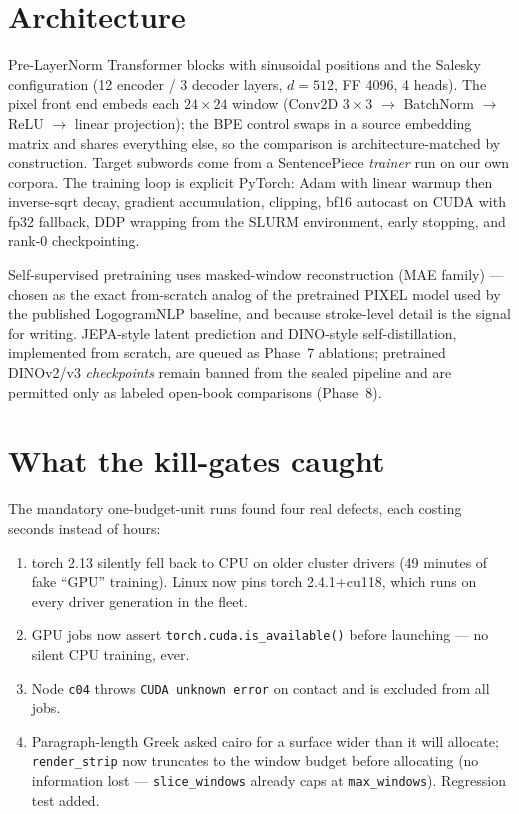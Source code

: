 \documentclass[11pt]{article}
\begin{document}
\section{Architecture}
Pre-LayerNorm Transformer blocks with sinusoidal positions and the Salesky
configuration (12 encoder / 3 decoder layers, $d=512$, FF 4096, 4 heads). The
pixel front end embeds each $24\times24$ window (Conv2D $3\times3$
$\rightarrow$ BatchNorm $\rightarrow$ ReLU $\rightarrow$ linear projection);
the BPE control swaps in a source embedding matrix and shares everything else,
so the comparison is architecture-matched by construction. Target subwords come
from a SentencePiece \emph{trainer} run on our own corpora. The training loop
is explicit PyTorch: Adam with linear warmup then inverse-sqrt decay, gradient
accumulation, clipping, bf16 autocast on CUDA with fp32 fallback, DDP wrapping
from the SLURM environment, early stopping, and rank-0 checkpointing.

Self-supervised pretraining uses masked-window reconstruction (MAE family) ---
chosen as the exact from-scratch analog of the pretrained PIXEL model used by
the published LogogramNLP baseline, and because stroke-level detail is the
signal for writing. JEPA-style latent prediction and DINO-style
self-distillation, implemented from scratch, are queued as Phase~7 ablations;
pretrained DINOv2/v3 \emph{checkpoints} remain banned from the sealed pipeline
and are permitted only as labeled open-book comparisons (Phase~8).

\section{What the kill-gates caught}
The mandatory one-budget-unit runs found four real defects, each costing
seconds instead of hours:
\begin{enumerate}
  \item torch 2.13 silently fell back to CPU on older cluster drivers (49
        minutes of fake ``GPU'' training). Linux now pins torch 2.4.1+cu118,
        which runs on every driver generation in the fleet.
  \item GPU jobs now assert \texttt{torch.cuda.is\_available()} before
        launching --- no silent CPU training, ever.
  \item Node \texttt{c04} throws \texttt{CUDA unknown error} on contact and is
        excluded from all jobs.
  \item Paragraph-length Greek asked cairo for a surface wider than it will
        allocate; \texttt{render\_strip} now truncates to the window budget
        before allocating (no information lost --- \texttt{slice\_windows}
        already caps at \texttt{max\_windows}). Regression test added.
\end{enumerate}
\end{document}
